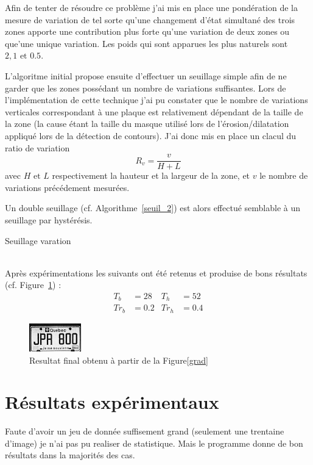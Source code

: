\documentclass[a4paper,10pt,twocolumn]{article}
\begin{document}
Afin de tenter de résoudre ce problème j'ai mis en place une pondération de la mesure de variation de tel sorte qu'une changement d'état simultané des trois zones apporte une contribution plus forte qu'une variation de deux zones ou que'une unique variation. Les poids qui sont apparues les plus naturels sont $2, 1 \text{ et } 0.5$.

L'algoritme initial propose ensuite d'effectuer un seuillage simple afin de ne garder que les zones possédant un nombre de variations suffisantes. Lors de l'implémentation de cette technique j'ai pu constater que le nombre de variations verticales correspondant à une plaque est relativement dépendant de la taille de la zone (la cause étant la taille du masque utilisé lors de l'érosion/dilatation appliqué lors de la détection de contours). J'ai donc mis en place un clacul du ratio de variation
\begin{equation}
  R_v = \frac{v}{H+L}
\end{equation}
avec $H \text{ et } L$ respectivement la hauteur et la largeur de la zone, et $v$ le nombre de variations précédement mesurées.

Un double seuillage (cf. Algorithme~\ref{seuil_2}) est alors effectué semblable à un seuillage par hystérésis.
\begin{algorithm} 
	\caption{Seuillage varation\label{seuil_2}}
	
\end{algorithm}\\
Après expérimentations les suivants ont été retenus et produise de bons résultats (cf. Figure~\ref{plate}) :
\begin{align*}
  T_b &= 28 &T_h &= 52\\
  Tr_b &= 0.2 &Tr_h &= 0.4
\end{align*}
\begin{figure}[H]
	\centering 
	  \includegraphics{img/plate.png}
	\caption{Resultat final obtenu à partir de la Figure\ref{grad}\label{plate}}
\end{figure}

\section{Résultats expérimentaux}
Faute d'avoir un jeu de donnée suffisement grand (seulement une trentaine d'image) je n'ai pas pu realiser de statistique. Mais le programme donne de bon résultats dans la majorités des cas.
\end{document}
